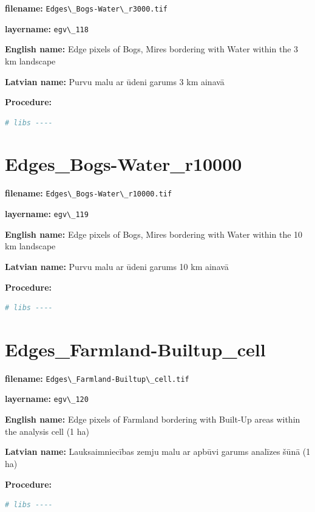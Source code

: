 \documentclass[
]{book}
\newcommand{\passthrough}[1]{#1}
\begin{document}
\textbf{filename:} \passthrough{\lstinline!Edges\_Bogs-Water\_r3000.tif!}

\textbf{layername:} \passthrough{\lstinline!egv\_118!}

\textbf{English name:} Edge pixels of Bogs, Mires bordering with Water within the 3 km landscape

\textbf{Latvian name:} Purvu malu ar ūdeni garums 3 km ainavā

\textbf{Procedure:}

\begin{lstlisting}[language=R]
# libs ----
\end{lstlisting}

\section{Edges\_Bogs-Water\_r10000}\label{ch06.119}

\textbf{filename:} \passthrough{\lstinline!Edges\_Bogs-Water\_r10000.tif!}

\textbf{layername:} \passthrough{\lstinline!egv\_119!}

\textbf{English name:} Edge pixels of Bogs, Mires bordering with Water within the 10 km landscape

\textbf{Latvian name:} Purvu malu ar ūdeni garums 10 km ainavā

\textbf{Procedure:}

\begin{lstlisting}[language=R]
# libs ----
\end{lstlisting}

\section{Edges\_Farmland-Builtup\_cell}\label{ch06.120}

\textbf{filename:} \passthrough{\lstinline!Edges\_Farmland-Builtup\_cell.tif!}

\textbf{layername:} \passthrough{\lstinline!egv\_120!}

\textbf{English name:} Edge pixels of Farmland bordering with Built-Up areas within the analysis cell (1 ha)

\textbf{Latvian name:} Lauksaimniecības zemju malu ar apbūvi garums analīzes šūnā (1 ha)

\textbf{Procedure:}

\begin{lstlisting}[language=R]
# libs ----
\end{lstlisting}
\end{document}
